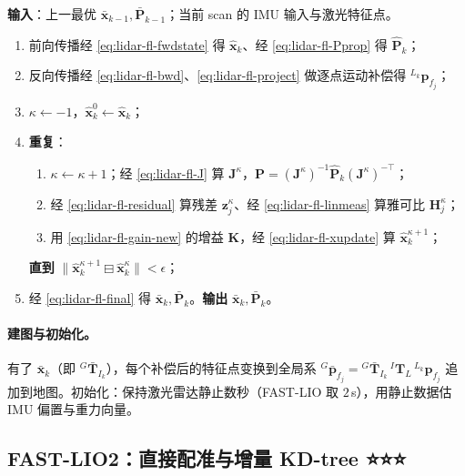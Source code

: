 \begin{algo}\label{alg:lidar-fastlio}
\textbf{输入}：上一最优 $\bar{\mathbf{x}}_{k-1},\bar{\mathbf{P}}_{k-1}$；当前 scan 的 IMU 输入与激光特征点。
\begin{enumerate}
  \item 前向传播经 \cref{eq:lidar-fl-fwdstate} 得 $\hat{\mathbf{x}}_k$、经 \cref{eq:lidar-fl-Pprop} 得 $\hat{\mathbf{P}}_k$；
  \item 反向传播经 \cref{eq:lidar-fl-bwd}、\cref{eq:lidar-fl-project} 做逐点运动补偿得 ${}^{L_k}\mathbf{p}_{f_j}$；
  \item $\kappa\leftarrow-1$，$\hat{\mathbf{x}}^{0}_k\leftarrow\hat{\mathbf{x}}_k$；
  \item \textbf{重复}：
  \begin{enumerate}
    \item $\kappa\leftarrow\kappa+1$；经 \cref{eq:lidar-fl-J} 算 $\mathbf{J}^\kappa$，$\mathbf{P}=(\mathbf{J}^\kappa)^{-1}\hat{\mathbf{P}}_k(\mathbf{J}^\kappa)^{-\top}$；
    \item 经 \cref{eq:lidar-fl-residual} 算残差 $\mathbf{z}^\kappa_j$、经 \cref{eq:lidar-fl-linmeas} 算雅可比 $\mathbf{H}^\kappa_j$；
    \item 用 \cref{eq:lidar-fl-gain-new} 的增益 $\mathbf{K}$，经 \cref{eq:lidar-fl-xupdate} 算 $\hat{\mathbf{x}}^{\kappa+1}_k$；
  \end{enumerate}
  \textbf{直到} $\|\hat{\mathbf{x}}^{\kappa+1}_k\boxminus\hat{\mathbf{x}}^\kappa_k\|<\epsilon$；
  \item 经 \cref{eq:lidar-fl-final} 得 $\bar{\mathbf{x}}_k,\bar{\mathbf{P}}_k$。\textbf{输出} $\bar{\mathbf{x}}_k,\bar{\mathbf{P}}_k$。
\end{enumerate}
\end{algo}

\paragraph{建图与初始化。}
有了 $\bar{\mathbf{x}}_k$（即 ${}^G\bar{\mathbf{T}}_{I_k}$），每个补偿后的特征点变换到全局系 ${}^G\bar{\mathbf{p}}_{f_j}={}^G\bar{\mathbf{T}}_{I_k}\,{}^I\mathbf{T}_L\,{}^{L_k}\mathbf{p}_{f_j}$ 追加到地图。初始化：保持激光雷达静止数秒（FAST-LIO 取 $2$\,s），用静止数据估 IMU 偏置与重力向量。

\subsection{FAST-LIO2：直接配准与增量 KD-tree ⭐⭐⭐}
\label{sec:lidar-fastlio2}

